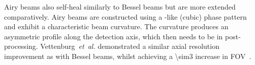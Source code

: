 \gls{Airy beam}s also self-heal similarly to \gls{Bessel beam}s but are more extended comparatively.
\gls{Airy beam}s are constructed using a -like (cubic) phase pattern and exhibit a characteristic beam curvature.
The curvature produces an asymmetric profile along the detection axis, which then needs to be  in post-processing.
Vettenburg~\emph{et~al.} demonstrated a similar axial resolution improvement as with \gls{Bessel beam}s, whilst achieving a \SI{\sim3}{} increase in \gls{FOV}~\cite{vettenburg_light-sheet_2014}.


